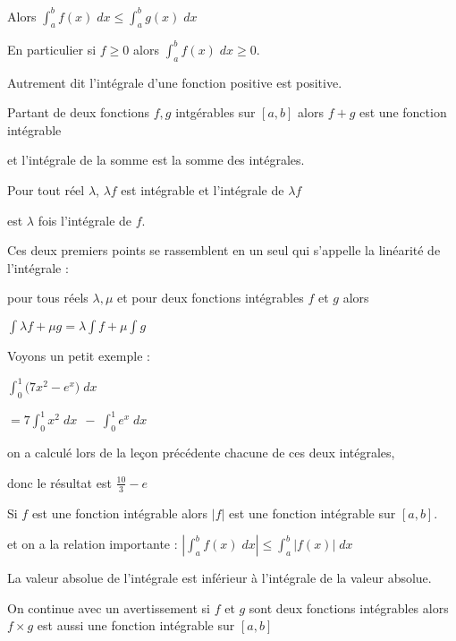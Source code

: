 Alors $\int_a^b f(x)\;dx \le\int_a^b g(x)\;dx$

\change


En particulier si $f\ge 0$ alors $\int_a^bf(x)\;dx \ge 0$.

Autrement dit l'intégrale d'une fonction positive est positive.


\diapo

Partant de deux fonctions $f,g$ intgérables sur $[a,b]$
alors $f+g$ est une fonction intégrable 



et l'intégrale de la somme est la somme des intégrales.

\change

Pour tout réel $\lambda$,  $\lambda f$ est
intégrable et 
l'intégrale de $\lambda f$

est $\lambda$ fois l'intégrale de $f$.

\change


Ces deux premiers points se rassemblent en un seul qui s'appelle la linéarité de l'intégrale :


pour tous réels $\lambda,\mu$ et pour deux fonctions intégrables $f$ et $g$ alors

$\int \lambda f+\mu g = \lambda\int f +\mu\int g$

\change

Voyons un petit exemple :

$\int_0^1 \big(7x^2-e^x\big) \; dx  $

\change

$= 7 \int_0^1 x^2\; dx \ \ - \  \int_0^1 e^x \; dx$

on a calculé lors de la leçon précédente chacune de ces deux intégrales, 

\change

\change

donc le résultat est $\frac{10}{3}-e$


\diapo

Si $f$ est une fonction intégrable alors $|f|$ est une fonction intégrable sur $[a,b]$.


et on a la relation importante :
$\left\vert\int_a^b f(x) \;dx\right\vert\le\int_a^b\big\vert f(x)\big\vert \;dx$

La valeur absolue de l'intégrale est inférieur à l'intégrale de la valeur absolue.

\change


On continue avec un avertissement 
si $f$ et $g$ sont deux fonctions intégrables alors 
$f \times g$ est aussi une fonction intégrable sur $[a,b]$

